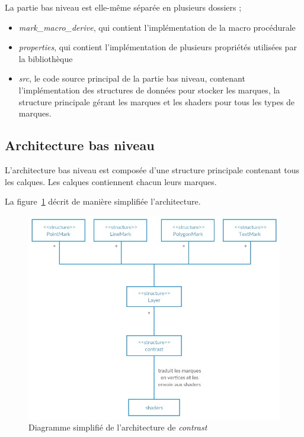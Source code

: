 \documentclass[12pt]{article}
\begin{document}
La partie bas niveau est elle-même séparée en plusieurs dossiers ;
\begin{itemize}
\item \textit{mark\_macro\_derive}, qui contient l'implémentation de la macro procédurale
\item \textit{properties}, qui contient l'implémentation de plusieurs propriétés utilisées par la bibliothèque
\item \textit{src}, le code source principal de la partie bas niveau, contenant l'implémentation des structures de données pour stocker les marques, la structure principale gérant les marques et les shaders pour tous les types de marques.
\end{itemize}

\subsection{Architecture bas niveau}

L'architecture bas niveau est composée d'une structure principale contenant tous les calques. Les calques contiennent
chacun leurs marques.

La figure~\ref{fig:arch} décrit de manière simplifiée l'architecture.

\begin{figure}[htp]
  \centering
  \includegraphics[scale=1.0]{images/architecture}
  \caption{Diagramme simplifié de l'architecture de \textit{contrast} }
  \label{fig:arch}
\end{figure}
\end{document}
